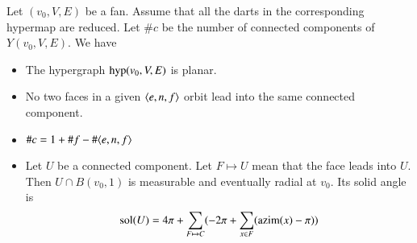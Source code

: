 \begin{lemma}  Let $(v_0,V,E)$ be a fan.  Assume
that all the darts in the corresponding hypermap are reduced.   
Let $\#c$ be the number
of connected components of $Y(v_0,V,E)$.  We have
    \begin{itemize}
    \item The hypergraph ${\operatorname{hyp}}(v_0,V,E)$ is planar.
    \item No two faces in a given $\langle e,n,f\rangle$ orbit lead
    into the same connected component.
    \item $\#c = 1 + \#f - \#\langle e,n,f\rangle$
    \item Let $U$ be a connected component. Let $F\mapsto U$ mean
    that the face leads into $U$.  Then $U \cap B(v_0,1)$ 
       is measurable and eventually radial at $v_0$.  Its solid angle is
        $${\operatorname{sol}}(U) = 4\pi + \sum_{F\mapsto C}(-2\pi + \sum_{x\in F}
        ({\operatorname{azim}}(x)-\pi))$$
    \end{itemize}
\end{lemma}

